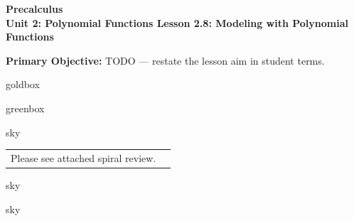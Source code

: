 \documentclass[10pt]{article}
\newcommand{\CourseName}{Precalculus}
\newcommand{\UnitNumberName}{Unit 2: Polynomial Functions \quad}
\newcommand{\LessonNumberName}{Lesson 2.8: Modeling with Polynomial Functions}
\begin{document}
\begin{center}
    {\Large\bfseries \CourseName \\
    {\small\bfseries \UnitNumberName \LessonNumberName}}
\end{center}

\begin{tcolorbox}[colback=sky, colframe=navy, boxrule=0.9pt, arc=2mm,
    left=2mm, right=2mm, top=1.5mm, bottom=1.5mm]
    \textbf{Primary Objective:} TODO --- restate the lesson aim in student terms.
\end{tcolorbox}

\renewcommand{\arraystretch}{1.6}
\begin{skillbox}{goldbox}
\end{skillbox}

\begin{skillbox}{greenbox}
\end{skillbox}

\begin{skillbox}{sky}
    \begin{tabularx}{\linewidth}{@{}X c@{}}
        \begin{minipage}[t]{0.55\linewidth}\vspace{0pt}
            Please see attached spiral review.  %
        \end{minipage}
        &
        \begin{minipage}[t]{0.38\linewidth}\vspace{0pt}\centering
        \end{minipage}
    \end{tabularx}
\end{skillbox}

\begin{skillbox}[Hook]{sky}
\end{skillbox}

\begin{skillbox}[Lesson]{sky}
\end{skillbox}
\end{document}
